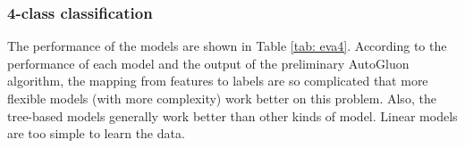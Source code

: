 \documentclass{article}
\begin{document}
\subsubsection{4-class classification}
The performance of the models are shown in Table \ref{tab: eva4}. According to the performance of each model and the output of the preliminary AutoGluon algorithm, the mapping from features to labels are so complicated that more flexible models (with more complexity) work better on this problem. Also, the tree-based models generally work better than other kinds of model. Linear models are too simple to learn the data. 
\begin{table}[H]
\centering
\caption{Evaluations of each model for 4-class classification}
\label{tab: eva4}
\end{table}
\end{document}
